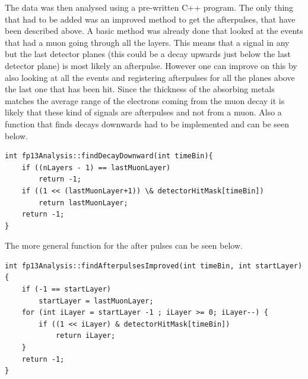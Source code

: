 The data was then analysed using a pre-written C++ program. 
The only thing that had to be added was an improved method to get the afterpulses, that have been described above. A basic method was already done that looked at the events that had a muon going through all the layers. This means that a signal in any but the last detector planes (this could be a decay upwards just below the last detector plane) is most likely an afterpulse. However one can improve on this by also looking at all the events and registering afterpulses for all the planes above the last one that has been hit. Since the thickness of the absorbing metals matches the average range of the electrons coming from the muon decay it is likely that these kind of signals are afterpulses and not from a muon. Also a function that finds decays downwards had to be implemented and can be seen below.
\begin{lstlisting}
int fp13Analysis::findDecayDownward(int timeBin){
    if ((nLayers - 1) == lastMuonLayer)
        return -1;
    if ((1 << (lastMuonLayer+1)) \& detectorHitMask[timeBin])
        return lastMuonLayer;
	return -1;
}
\end{lstlisting}
The more general function for the after pulses can be seen below.
\begin{lstlisting}
int fp13Analysis::findAfterpulsesImproved(int timeBin, int startLayer) {
    if (-1 == startLayer) 
    	startLayer = lastMuonLayer;
    for (int iLayer = startLayer -1 ; iLayer >= 0; iLayer--) {
        if ((1 << iLayer) & detectorHitMask[timeBin]) 
        	return iLayer;
    }
	return -1;
}
\end{lstlisting}

